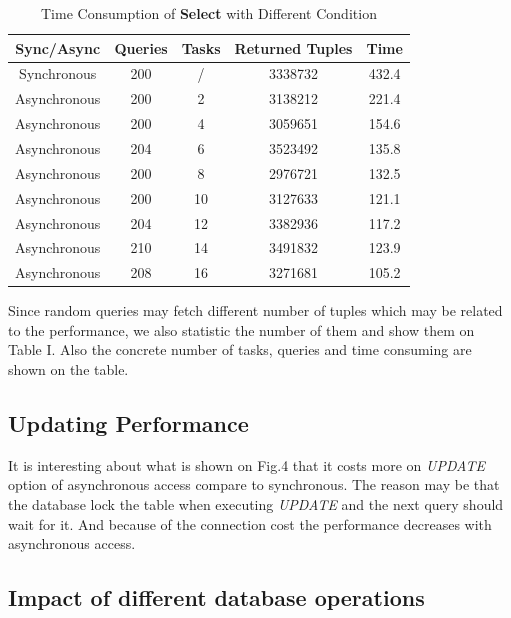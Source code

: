 \documentclass[onecolumn, conference, 12pt]{IEEEtran}
\begin{document}
	\begin{table}
		\centering
		\caption{Time Consumption of \textbf{Select} with Different Condition}
		\begin{tabular}{|c|c|c|c|c|}
			\hline
			Sync/Async & Queries & Tasks & Returned Tuples & Time\\
			\hline
			Synchronous & 200 & / & 3338732	& 432.4\\
			\hline
			Asynchronous & 200 & 2 & 3138212 & 221.4\\
			\hline
			Asynchronous & 200 & 4 & 3059651 & 154.6\\
			\hline
			Asynchronous & 204 & 6 & 3523492 & 135.8\\
			\hline
			Asynchronous & 200 & 8 & 2976721 & 132.5\\
			\hline
			Asynchronous & 200 & 10 & 3127633 & 121.1\\
			\hline
			Asynchronous & 204 & 12 & 3382936 & 117.2\\
			\hline
			Asynchronous & 210 & 14 & 3491832 & 123.9\\
			\hline
			Asynchronous & 208 & 16 & 3271681 & 105.2\\
			\hline
		\end{tabular}
		\label{T1}
	\end{table}
	
	Since random queries may fetch different number of tuples which may be related to the performance, we also statistic the number of them and show them on Table I. Also the concrete number of tasks, queries and time consuming are shown on the table. 
	
	\subsection{Updating Performance}
	It is interesting about what is shown on Fig.4 that it costs more on \emph{UPDATE} option of asynchronous access compare to synchronous. The reason may be that the database lock the table when executing \emph{UPDATE} and the next query should wait for it. And because of the connection cost the performance decreases with asynchronous access. 
	   
	
	
	\subsection{Impact of different database operations}
	
\end{document}
